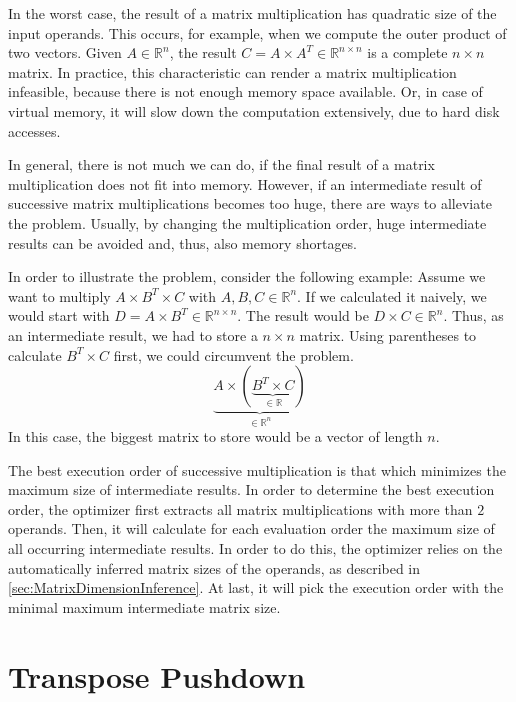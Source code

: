 In the worst case, the result of a matrix multiplication has quadratic size of the input operands.
This occurs, for example, when we compute the outer product of two vectors.
Given $A \in \mathbb{R}^{n}$, the result $C = A\times A^T \in \mathbb{R}^{n\times n}$ is a complete $n\times n$ matrix.
In practice, this characteristic can render a matrix multiplication infeasible, because there is not enough memory space available.
Or, in case of virtual memory, it will slow down the computation extensively, due to hard disk accesses.

In general, there is not much we can do, if the final result of a matrix multiplication does not fit into memory.
However, if an intermediate result of successive matrix multiplications becomes too huge, there are ways to alleviate the problem.
Usually, by changing the multiplication order, huge intermediate results can be avoided and, thus, also memory shortages.

In order to illustrate the problem, consider the following example:
Assume we want to multiply $A\times B^T \times C$ with $A,B,C\in \mathbb{R}^{n}$.
If we calculated it naively, we would start with $D=A\times B^T \in \mathbb{R}^{n\times n}$.
The result would be $D\times C \in \mathbb{R}^{n}$.
Thus, as an intermediate result, we had to store a $n\times n$ matrix.
Using parentheses to calculate $B^T \times C$ first, we could circumvent the problem.
\begin{displaymath}
	\underbrace{A\times \left( \underbrace{B^T \times C}_{\in \mathbb{R}}\right)}_{\in \mathbb{R}^{n}}
\end{displaymath}
In this case, the biggest matrix to store would be a vector of length $n$.

The best execution order of successive multiplication is that which minimizes the maximum size of intermediate results.
In order to determine the best execution order, the optimizer first extracts all matrix multiplications with more than $2$ operands.
Then, it will calculate for each evaluation order the maximum size of all occurring intermediate results.
In order to do this, the optimizer relies on the automatically inferred matrix sizes of the operands, as described in \cref{sec:MatrixDimensionInference}.
At last, it will pick the execution order with the minimal maximum intermediate matrix size.

\section{Transpose Pushdown}

